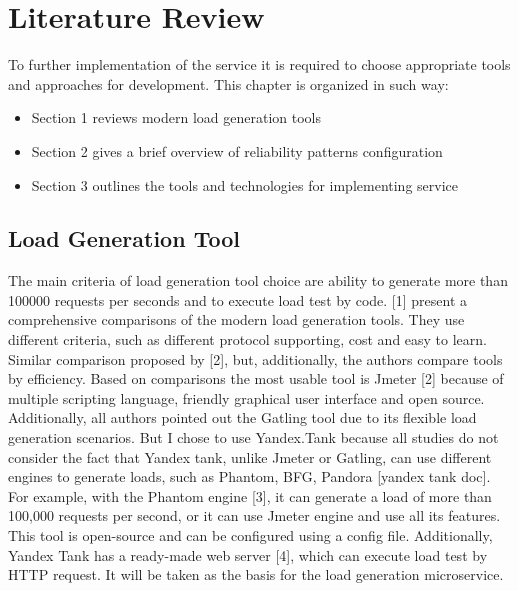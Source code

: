 
\chapter{Literature Review}
\label{ch:lr}


To further implementation of the service it is required to choose appropriate tools and approaches for development.
This chapter is organized in such way:

\begin{itemize}
    \item Section 1 reviews modern load generation tools
    \item Section 2 gives a brief overview of reliability patterns configuration
    \item Section 3 outlines the tools and technologies for implementing service
\end{itemize}

\section{Load Generation Tool}\label{sec:load-generation}

The main criteria of load generation tool choice are ability to generate more than 100000 requests per seconds and to execute load test by code.
[1] present a comprehensive comparisons of the modern load generation tools.
They use different criteria, such as different protocol supporting, cost and easy to learn.
Similar comparison proposed by [2], but, additionally, the authors compare tools by efficiency.
Based on comparisons the most usable tool is Jmeter [2] because of multiple scripting language, friendly graphical user interface and open source.
Additionally, all authors pointed out the Gatling tool due to its flexible load generation scenarios.
But I chose to use Yandex.Tank because all studies do not consider the fact that Yandex tank, unlike Jmeter or Gatling, can use different engines to generate loads, such as Phantom, BFG, Pandora [yandex tank doc].
For example, with the Phantom engine [3], it can generate a load of more than 100,000 requests per second, or it can use Jmeter engine and use all its features.
This tool is open-source and can be configured using a config file.
Additionally, Yandex Tank has a ready-made web server [4], which can execute load test by HTTP request.
It will be taken as the basis for the load generation microservice.


